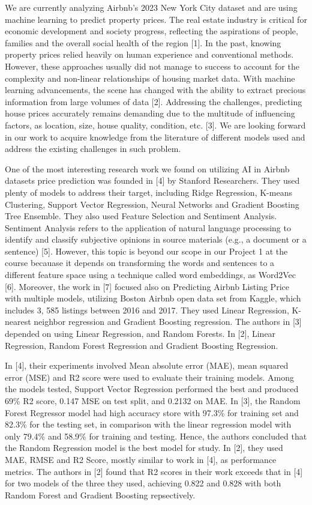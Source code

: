 \documentclass[a4paper,12pt]{article}
\begin{document}
We are currently analyzing Airbnb's 2023 New York City dataset and are using machine learning to predict property prices. The real estate industry is critical for economic development and society progress, reflecting the aspirations of people, families and the overall social health of the region [1]. In the past, knowing property prices relied heavily on human experience and conventional methods. However, these approaches usually did not manage to success to account for the complexity and non-linear relationships of housing market data. With machine learning advancements, the scene has changed with the ability to extract precious information from large volumes of data [2]. Addressing the challenges, predicting house prices accurately remains demanding due to the multitude of influencing factors, as location, size, house quality, condition, etc. [3]. We are looking forward in our work to acquire knowledge from the literature of different models used and address the existing challenges in such problem.

One of the most interesting research work we found on utilizing AI in Airbnb datasets price prediction was founded in [4] by Stanford Researchers. They used plenty of models to address their target, including Ridge Regression, K-means Clustering, Support Vector Regression, Neural Networks and Gradient Boosting Tree Ensemble. They also used Feature Selection and Sentiment Analysis. Sentiment Analysis refers to the application of natural language processing to identify and classify subjective opinions in source materials (e.g., a document or a sentence) [5]. However, this topic is beyond our scope in our Project 1 at the course becauase it depends on transforming the words and sentences to a different feature space using a technique called word embeddings, as Word2Vec [6]. Moreover, the work in [7] focused also on Predicting Airbnb Listing Price with multiple models, utilizing Boston Airbnb open data set from Kaggle, which includes 3, 585 listings between 2016 and 2017. They used Linear Regression, K-nearest neighbor regression and Gradient Boosting regression. The authors in [3] depended on using Linear Regression, and Random Forests. In [2], Linear Regression, Random Forest Regression and Gradient Boosting Regression.

In [4], their experiments involved Mean absolute error (MAE), mean squared error (MSE) and R2 score were used to evaluate their training models. Among the models tested, Support Vector Regression performed the best and produced 69\% R2 score, 0.147 MSE on test split, and 0.2132 on MAE. In [3], the Random Forest Regressor model had high accuracy store with 97.3\% for training set and 82.3\% for the testing set, in comparison with the linear regression model with only 79.4\% and 58.9\% for training and testing. Hence, the authors concluded that the Random Regression model is the best model for study. In [2], they used MAE, RMSE and R2 Score, mostly similar to work in [4], as performance metrics. The authors in [2] found that R2 scores in their work exceeds that in [4] for two models of the three they used, achieving 0.822 and 0.828 with both Random Forest and Gradient Boosting repsectively.
\end{document}
